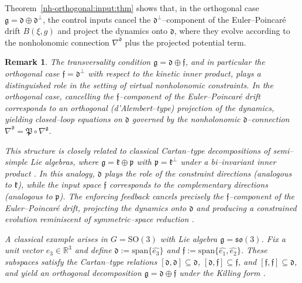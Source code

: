 \documentclass[letterpaper, 10 pt, conference]{ieeeconf}
\newtheorem{remark}{Remark}
\newcommand{\g}{\mathfrak{g}}
\newcommand{\h}{\mathfrak{d}}
\begin{document}
\medskip

Theorem~\ref{nh-orthogonal:input:thm} shows that, in the orthogonal case 
$\g=\h\oplus\h^\perp$, the control inputs cancel the $\h^\perp$--component of the 
Euler--Poincar\'e drift $B(\xi,g)$ and project the dynamics onto $\h$, where they evolve according to the nonholonomic connection $\nabla^\h$ plus the projected potential term.  



\begin{remark}
The transversality condition $\mathfrak g=\mathfrak d\oplus\mathfrak f$, and in particular the orthogonal case 
$\mathfrak f=\mathfrak d^\perp$ with respect to the kinetic inner product, plays a distinguished role in the setting of 
virtual nonholonomic constraints. In the orthogonal case, cancelling the $\mathfrak f$--component of the 
Euler--Poincar\'e drift corresponds to an orthogonal (d'Alembert--type) projection of the dynamics, yielding closed--loop 
equations on $\mathfrak d$ governed by the nonholonomic $\mathfrak d$--connection 
$\nabla^{\mathfrak d}=\mathfrak{P}\circ\nabla^{\mathfrak g}$.

This structure is closely related to classical Cartan--type decompositions of semi--simple Lie algebras, where 
$\mathfrak g=\mathfrak k\oplus\mathfrak p$ with $\mathfrak p=\mathfrak k^\perp$ under a bi--invariant inner product 
\cite{helgason1979differential}. In this analogy, $\mathfrak d$ plays the role of the constraint directions (analogous to 
$\mathfrak k$), while the input space $\mathfrak f$ corresponds to the complementary directions (analogous to 
$\mathfrak p$). The enforcing feedback cancels precisely the $\mathfrak f$--component of the Euler--Poincar\'e drift, 
projecting the dynamics onto $\mathfrak d$ and producing a constrained evolution reminiscent of symmetric--space 
reduction \cite{stratoglou2024nonholonomic}.

A classical example arises in $G=\mathrm{SO}(3)$ with Lie algebra $\mathfrak g=\mathfrak{so}(3)$. Fix a unit vector 
$e_3\in\mathbb{R}^3$ and define 
$\mathfrak d:=\mathrm{span}\{\widehat{e_3}\}$ and 
$\mathfrak f:=\mathrm{span}\{\widehat{e_1},\widehat{e_2}\}$. These subspaces satisfy the Cartan--type relations 
$[\mathfrak d,\mathfrak d]\subseteq\mathfrak d$, 
$[\mathfrak d,\mathfrak f]\subseteq\mathfrak f$, and 
$[\mathfrak f,\mathfrak f]\subseteq\mathfrak d$, and yield an orthogonal decomposition 
$\mathfrak g=\mathfrak d\oplus\mathfrak f$ under the Killing form \cite{bloch2003nonholonomic}. 


\end{remark}
\end{document}
